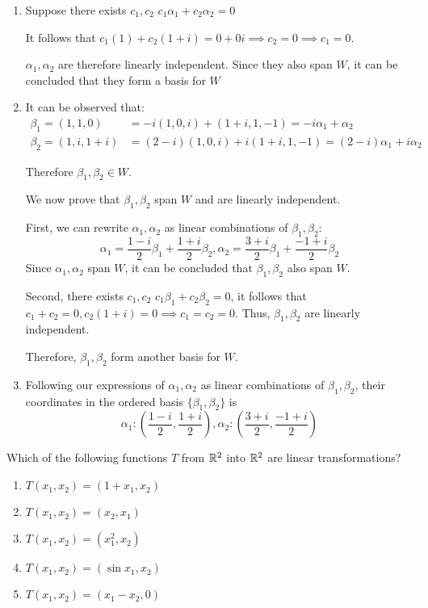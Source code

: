 \documentclass[a4paper, 11pt]{article}
\begin{document}
\begin{solution}
    \begin{enumerate} [label=(\alph*)]
        \item Suppose there exists \(c_1, c_2\) \st \(c_1\alpha_1 + c_2\alpha_2 = 0\)
        
        It follows that \(c_1(1) + c_2(1 + i) = 0 + 0i \implies c_2 = 0 \implies c_1 = 0\).

        \(\alpha_1, \alpha_2\) are therefore linearly independent. Since they also span \(W\), it can be concluded that they form a basis for \(W\)
        \item It can be observed that: \begin{align*}
            \beta_1 = (1, 1, 0) &= -i(1, 0, i) + (1+i, 1, -1) = -i\alpha_1 + \alpha_2 \\
            \beta_2 = (1, i, 1+i) &= (2-i)(1, 0, i) + i(1+i, 1, -1) = (2-i)\alpha_1 + i\alpha_2
        \end{align*}

        Therefore \(\beta_1, \beta_2 \in W\).

        We now prove that \(\beta_1, \beta_2\) span \(W\) and are linearly independent.

        First, we can rewrite \(\alpha_1, \alpha_2\) as linear combinations of \(\beta_1, \beta_2\): \[
        \alpha_1 = \frac{1-i}{2}\beta_1 + \frac{1+i}{2} \beta_2, \alpha_2 = \frac{3+i}{2}\beta_1 + \frac{-1 + i}{2} \beta_2
        \]
        Since \(\alpha_1, \alpha_2\) span \(W\), it can be concluded that \(\beta_1, \beta_2\) also span \(W\).

        Second, there exists \(c_1, c_2\) \st \(c_1\beta_1 + c_2\beta_2 = 0\), it follows that \(c_1 + c_2 = 0, c_2(1+i) = 0 \implies c_1 = c_2 = 0\). Thus, \(\beta_1, \beta_2\) are linearly independent.

        Therefore, \(\beta_1, \beta_2\) form another basis for \(W\).
        \item Following our expressions of \(\alpha_1, \alpha_2\) as linear combinations of \(\beta_1, \beta_2\), their coordinates in the ordered basis \(\{\beta_1, \beta_2\}\) is \[
        \alpha_1: \left(\frac{1-i}{2},\frac{1+i}{2}\right), \alpha_2: \left(\frac{3+i}{2},\frac{-1 + i}{2}\right)
        \]
    \end{enumerate}
\end{solution}
\begin{problem} 
    Which of the following functions \(T\) from \(\mathbb{R}^2\) into \(\mathbb{R}^2\) are linear transformations?
    \begin{enumerate} [label=(\alph*)]
        \item \(T(x_1, x_2) = (1 + x_1, x_2)\)
        \item \(T(x_1, x_2) = (x_2, x_1)\)
        \item \(T(x_1, x_2) = (x_1^2, x_2)\)
        \item \(T(x_1, x_2) = (\sin x_1, x_2)\)
        \item \(T(x_1, x_2) = (x_1 - x_2, 0)\)
    \end{enumerate}
\end{problem}
\end{document}
